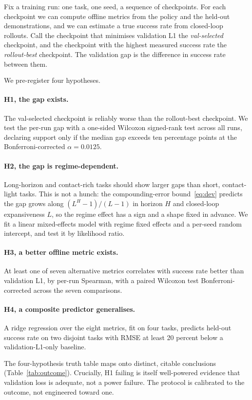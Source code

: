 Fix a training run: one task, one seed, a sequence of checkpoints. For each checkpoint we
can compute offline metrics from the policy and the held-out demonstrations, and we can
estimate a true success rate from closed-loop rollouts. Call the checkpoint that minimises
validation L1 the \emph{val-selected} checkpoint, and the checkpoint with the highest
measured success rate the \emph{rollout-best} checkpoint. The validation gap is the
difference in success rate between them.

We pre-register four hypotheses.

\paragraph{H1, the gap exists.} The val-selected checkpoint is reliably worse than the
rollout-best checkpoint. We test the per-run gap with a one-sided Wilcoxon signed-rank test
across all \NRuns{} runs, declaring support only if the median gap exceeds ten percentage
points at the Bonferroni-corrected $\alpha = 0.0125$.

\paragraph{H2, the gap is regime-dependent.} Long-horizon and contact-rich tasks should
show larger gaps than short, contact-light tasks. This is not a hunch: the compounding-error
bound~\eqref{eq:dev} predicts the gap grows along $(L^H-1)/(L-1)$ in horizon $H$ and closed-loop
expansiveness $L$, so the regime effect has a sign and a shape fixed in advance. We fit a linear mixed-effects model
with regime fixed effects and a per-seed random intercept, and test it by likelihood ratio.

\paragraph{H3, a better offline metric exists.} At least one of seven alternative metrics
correlates with success rate better than validation L1, by per-run Spearman, with a paired
Wilcoxon test Bonferroni-corrected across the seven comparisons.

\paragraph{H4, a composite predictor generalises.} A ridge regression over the eight
metrics, fit on four tasks, predicts held-out success rate on two disjoint tasks with RMSE
at least 20 percent below a validation-L1-only baseline.

The four-hypothesis truth table maps onto distinct, citable conclusions (Table~\ref{tab:outcome}).
Crucially, H1 failing is itself well-powered evidence that validation loss is adequate, not a
power failure. The protocol is calibrated to the outcome, not engineered toward one.

